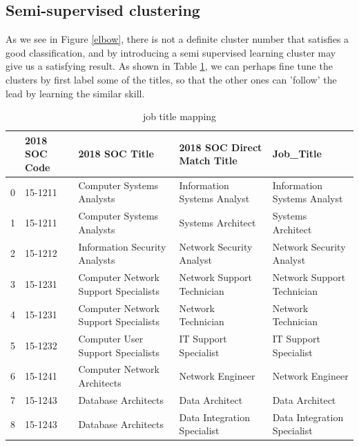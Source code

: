 \subsection{Semi-supervised clustering}
As we see in Figure \ref{elbow}, there is not a definite cluster number that satisfies a good classification, and by introducing a semi supervised learning cluster may give us a satisfying result. As shown in Table \ref{titlemapping}, we can perhaps fine tune the clusters by first label some of the titles, so that the other ones can 'follow' the lead by learning the similar skill. 
\begin{table}[h!]
	\caption{job title mapping}
	\label{titlemapping}
	\resizebox{\columnwidth}{!}
	{%
		
		\begin{tabular}{lllll}
			\hline
			{} & 2018 SOC Code &                                   2018 SOC Title &    2018 SOC Direct Match Title &                      Job\_Title \\
			\hline
			0  &       15-1211 &                        Computer Systems Analysts &    Information Systems Analyst &    Information Systems Analyst \\
			1  &       15-1211 &                        Computer Systems Analysts &              Systems Architect &              Systems Architect \\
			2  &       15-1212 &                    Information Security Analysts &       Network Security Analyst &       Network Security Analyst \\
			3  &       15-1231 &             Computer Network Support Specialists &     Network Support Technician &     Network Support Technician \\
			4  &       15-1231 &             Computer Network Support Specialists &             Network Technician &             Network Technician \\
			5  &       15-1232 &                Computer User Support Specialists &          IT Support Specialist &          IT Support Specialist \\
			6  &       15-1241 &                      Computer Network Architects &               Network Engineer &               Network Engineer \\
			7  &       15-1243 &                              Database Architects &                 Data Architect &                 Data Architect \\
			8  &       15-1243 &                              Database Architects &    Data Integration Specialist &    Data Integration Specialist \\

\end{tabular}}
\end{table}
